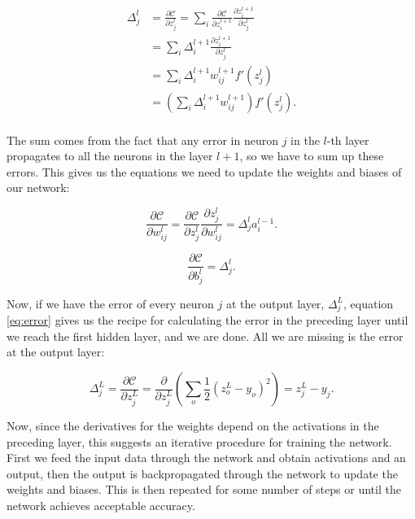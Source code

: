 \begin{equation}\label{eq:error}
\begin{split}
\Delta_j^l &= \frac{\partial \mathcal{C}}{\partial z_j^l} = \sum_i \frac{\partial \mathcal{C}}{\partial z_i^{l+1}}
\frac{\partial z_i^{l+1}}{\partial z_j^l} \\
           &= \sum_i \Delta_i^{l+1} \frac{\partial z_i^{l+1}}{\partial z_j^l} \\
           &= \sum_i \Delta_i^{l+1} w_{ij}^{l+1} f'(z_j^l) \\
           &= \left( \sum_i \Delta_i^{l+1} w_{ij}^{l+1} \right) f'(z_j^l) .\\
\end{split}
\end{equation}

The sum comes from the fact that any error in neuron $j$ in the $l$-th layer propagates to all the neurons
in the layer $l + 1$, so we have to sum up these errors.
This gives us the equations we need to update the weights and biases of our network:

\begin{equation}
 \frac{\partial \mathcal{C}}{\partial w_{ij}^l} 
= \frac{\partial \mathcal{C}}{\partial z_j^l} 
\frac{\partial z_j^l}{\partial w_{ij}^l}
= \Delta_j^l a_i^{l-1} .
\end{equation}

\begin{equation}
 \frac{\partial \mathcal{C}}{\partial b_{j}^l} = \Delta_j^l .
\end{equation}

Now, if we have the error of every neuron $j$ at the output layer,
$\Delta_j^L$, equation \ref{eq:error}
gives us the recipe for calculating the error in the preceding layer until we reach the first hidden layer, 
and we are done. All we are missing is the error at the output layer:

\begin{equation}
\Delta_j^L = \frac{\partial \mathcal{C}}{\partial z_j^L} 
= \frac{\partial}{\partial z_j^L} \left(
    \sum_o \frac{1}{2}\left( z_o^L - y_o\right)^2 \right) 
    = z_j^L - y_j .
\end{equation}

Now, since the derivatives for the weights depend on
the activations in the preceding layer, this suggests
an iterative procedure for training the network.
First we feed the input data through the network
and obtain activations and an output, then the
output is backpropagated through the network to update the
weights and biases. This is then repeated for some number
of steps or until the network achieves acceptable accuracy.

